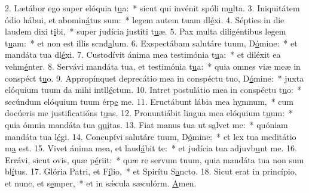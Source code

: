2. Lætábor ego super elóquia t\uline{u}a:~* sicut qui invénit spóli m\uline{u}lta.
3. Iniquitátem ódio hábui, et abomin\uline{á}tus sum:~* legem autem tuam dl\uline{é}xi.
4. Sépties in die laudem dixi t\uline{i}bi,~* super judícia justíti t\uline{u}æ.
5. Pax multa diligéntibus legem t\uline{u}am:~* et non est illis scnd\uline{a}lum.
6. Exspectábam salutáre tuum, D\uline{ó}mine:~* et mandáta tua dl\uline{é}xi.
7. Custodívit ánima mea testimónia t\uline{u}a:~* et diléxit ea vehm\uline{é}nter.
8. Servávi mandáta tua, et testimónia t\uline{u}a:~* quia omnes viæ meæ in conspéct t\uline{u}o.
9. Appropínquet deprecátio mea in conspéctu tuo, D\uline{ó}mine:~* juxta elóquium tuum da mihi intll\uline{é}ctum.
10. Intret postulátio mea in conspéctu t\uline{u}o:~* secúndum elóquium tuum érp\uline{e} me.
11. Eructábunt lábia mea h\uline{y}mnum,~* cum docúeris me justificatións t\uline{u}as.
12. Pronuntiábit lingua mea elóquium t\uline{u}um:~* quia ómnia mandáta tua \uline{qui}tas.
13. Fiat manus tua ut s\uline{a}lvet me:~* quóniam mandáta tua l\uline{é}gi.
14. Concupívi salutáre tuum, D\uline{ó}mine:~* et lex tua meditátio m\uline{a} est.
15. Vivet ánima mea, et laud\uline{á}bit te:~* et judícia tua adjuvb\uline{u}nt me.
16. Errávi, sicut ovis, quæ p\uline{é}riit:~* quæ re servum tuum, quia mandáta tua non sum bl\uline{í}tus.
17. Glória Patri, et F\uline{í}lio,~* et Spirítu S\uline{a}ncto.
18. Sicut erat in princípio, et nunc, et s\uline{e}mper,~* et in sǽcula sæculórm. \uline{A}men.

